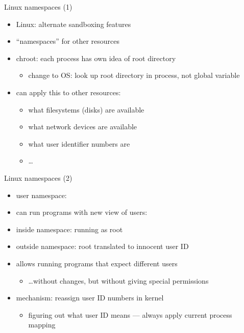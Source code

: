 \begin{frame}{Linux namespaces (1)}
    \begin{itemize}
    \item Linux: alternate sandboxing features
    \item ``namespaces'' for other resources
    \item chroot: each process has own idea of root directory
        \begin{itemize}
        \item change to OS: look up root directory in process, not global variable
        \end{itemize}
    \item can apply this to other resources:
        \begin{itemize}
        \item what filesystems (disks) are available
        \item what network devices are available
        \item what user identifier numbers are
        \item \ldots
        \end{itemize}
    \end{itemize}
\end{frame}

\begin{frame}{Linux namespaces (2)}
    \begin{itemize}
    \item user namespace:
    \vspace{.5cm}
    \item can run programs with new view of users:
    \vspace{.5cm}
    \item inside namespace: running as root
    \item outside namespace: root translated to innocent user ID
    \item allows running programs that expect different users
        \begin{itemize}
        \item \ldots without changes, but without giving special permissions
        \end{itemize}
    \vspace{.5cm}
    \item mechanism: reassign user ID numbers in kernel
        \begin{itemize}
        \item figuring out what user ID means --- always apply current process mapping
        \end{itemize}
    \end{itemize}
\end{frame}

